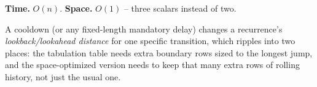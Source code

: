 \begin{complexitybox}
\textbf{Time.} $O(n)$.
\textbf{Space.} $O(1)$ -- three scalars instead of two.
\end{complexitybox}

\begin{takeawaybox}
A cooldown (or any fixed-length mandatory delay) changes a recurrence's
\emph{lookback/lookahead distance} for one specific transition, which
ripples into two places: the tabulation table needs extra boundary rows
sized to the longest jump, and the space-optimized version needs to keep
that many extra rows of rolling history, not just the usual one.
\end{takeawaybox}

